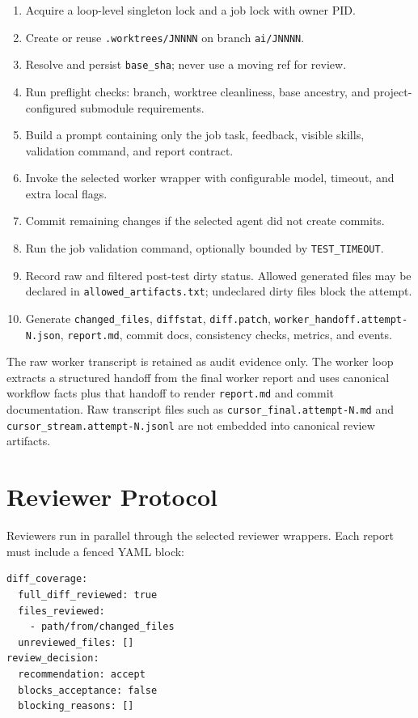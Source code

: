 \documentclass[11pt]{article}
\renewcommand{\path}[1]{\texttt{#1}}
\begin{document}
\begin{enumerate}
  \item Acquire a loop-level singleton lock and a job lock with owner PID.
  \item Create or reuse \path{.worktrees/JNNNN} on branch \path{ai/JNNNN}.
  \item Resolve and persist \path{base\_sha}; never use a moving ref for review.
  \item Run preflight checks: branch, worktree cleanliness, base ancestry, and
        project-configured submodule requirements.
  \item Build a prompt containing only the job task, feedback, visible skills,
        validation command, and report contract.
  \item Invoke the selected worker wrapper with configurable model, timeout, and
        extra local flags.
  \item Commit remaining changes if the selected agent did not create commits.
  \item Run the job validation command, optionally bounded by \path{TEST\_TIMEOUT}.
  \item Record raw and filtered post-test dirty status.  Allowed generated files
        may be declared in \path{allowed\_artifacts.txt}; undeclared dirty files
        block the attempt.
  \item Generate \path{changed\_files}, \path{diffstat}, \path{diff.patch},
        \path{worker\_handoff.attempt-N.json}, \path{report.md}, commit docs,
        consistency checks, metrics, and events.
\end{enumerate}

The raw worker transcript is retained as audit evidence only.  The worker loop
extracts a structured handoff from the final worker report and uses canonical
workflow facts plus that handoff to render \path{report.md} and commit
documentation.  Raw transcript files such as \path{cursor\_final.attempt-N.md}
and \path{cursor\_stream.attempt-N.jsonl} are not embedded into canonical review
artifacts.

\section{Reviewer Protocol}

Reviewers run in parallel through the selected reviewer wrappers.  Each report
must include a fenced YAML block:

\begin{verbatim}
diff_coverage:
  full_diff_reviewed: true
  files_reviewed:
    - path/from/changed_files
  unreviewed_files: []
review_decision:
  recommendation: accept
  blocks_acceptance: false
  blocking_reasons: []
\end{verbatim}
\end{document}
